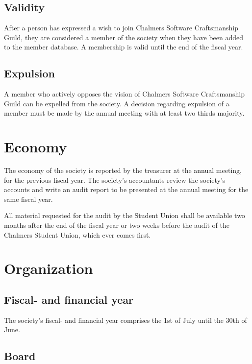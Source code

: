 \documentclass[a4paper]{article}
\newcommand{\name}{Chalmers Software Craftsmanship Guild}
\begin{document}
\subsection{Validity}

After a person has expressed a wish to join \name{}, they are considered
a member of the society  when they have been added to the member database.
A membership is valid until the end of the fiscal year.

\subsection{Expulsion}

A member who actively opposes the vision of \name{} can be expelled from the
society. A decision regarding expulsion of a member must be made by the annual
meeting with at least two thirds majority.


\section{Economy}

The economy of the society is reported by the treasurer at the annual meeting,
for the previous fiscal year.  The society's accountants review the society's
accounts and write an audit report to be presented at the annual meeting for the
same fiscal year.

All material requested for the audit by the Student Union shall be available two
months after the end of the fiscal year or two weeks before the audit of the
Chalmers Student Union, which ever comes first.


\section{Organization}

\subsection{Fiscal- and financial year}

The society's fiscal- and financial year comprises the 1st of July until the
30th of June.

\subsection{Board}
\end{document}
